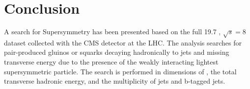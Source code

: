 \chapter{Conclusion}
\label{ch:conclusion}

\ifpdf
    \graphicspath{{Chapter10/Figs/Raster/}{Chapter10/Figs/PDF/}{Chapter10/Figs/}}
\else
    \graphicspath{{Chapter10/Figs/Vector/}{Chapter10/Figs/}}
\fi
















A search for Supersymmetry has been presented based on the full 19.7 \fb, 
$\sqrt{s} = 8$ \tev dataset collected with the CMS detector at the LHC. The
analysis searches for pair-produced gluinos or squarks decaying hadronically to
jets and missing transverse energy due to the presence of the weakly interacting
lightest supersymmetric particle. The search is performed in dimensions of \HT,
the total transverse hadronic energy, and the multiplicity of jets and b-tagged
jets.

